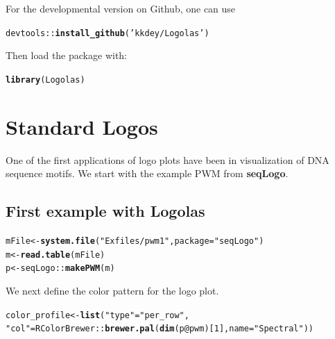 \documentclass[12pt]{article}\usepackage[]{graphicx}\usepackage[usenames,dvipsnames]{color}
\makeatletter
\newcommand{\hlnum}[1]{\textcolor[rgb]{0.686,0.059,0.569}{#1}}%
\newcommand{\hlstr}[1]{\textcolor[rgb]{0.192,0.494,0.8}{#1}}%
\newcommand{\hlopt}[1]{\textcolor[rgb]{0,0,0}{#1}}%
\newcommand{\hlstd}[1]{\textcolor[rgb]{0.345,0.345,0.345}{#1}}%
\newcommand{\hlkwb}[1]{\textcolor[rgb]{0.69,0.353,0.396}{#1}}%
\newcommand{\hlkwc}[1]{\textcolor[rgb]{0.333,0.667,0.333}{#1}}%
\newcommand{\hlkwd}[1]{\textcolor[rgb]{0.737,0.353,0.396}{\textbf{#1}}}%
\newenvironment{kframe}{%
 \def\at@end@of@kframe{}%
 \ifinner\ifhmode%
  \def\at@end@of@kframe{\end{minipage}}%
  \begin{minipage}{\columnwidth}%
 \fi\fi%
 \def\FrameCommand##1{\hskip\@totalleftmargin \hskip-\fboxsep
 \colorbox{shadecolor}{##1}\hskip-\fboxsep
     \hskip-\linewidth \hskip-\@totalleftmargin \hskip\columnwidth}%
 \MakeFramed {\advance\hsize-\width
   \@totalleftmargin\z@ \linewidth\hsize
   \@setminipage}}%
 {\par\unskip\endMakeFramed%
 \at@end@of@kframe}
\newenvironment{knitrout}{}{} %
\makeatother
\begin{document}
For the developmental version on Github, one can use

\begin{knitrout}
\color{fgcolor}\begin{kframe}
\begin{alltt}
\hlstd{devtools}\hlopt{::}\hlkwd{install_github}\hlstd{(}\hlstr{'kkdey/Logolas'}\hlstd{)}
\end{alltt}
\end{kframe}
\end{knitrout}

Then load the package with:

\begin{knitrout}
\color{fgcolor}\begin{kframe}
\begin{alltt}
\hlkwd{library}\hlstd{(Logolas)}
\end{alltt}
\end{kframe}
\end{knitrout}

\section{Standard Logos}

One of the first applications of logo plots have been in visualization of DNA sequence motifs. We start with the example PWM from \textbf{seqLogo}.

\subsection{First example with Logolas}

\begin{knitrout}
\color{fgcolor}\begin{kframe}
\begin{alltt}
\hlstd{mFile} \hlkwb{<-} \hlkwd{system.file}\hlstd{(}\hlstr{"Exfiles/pwm1"}\hlstd{,} \hlkwc{package}\hlstd{=}\hlstr{"seqLogo"}\hlstd{)}
\hlstd{m} \hlkwb{<-} \hlkwd{read.table}\hlstd{(mFile)}
\hlstd{p} \hlkwb{<-} \hlstd{seqLogo}\hlopt{::}\hlkwd{makePWM}\hlstd{(m)}
\end{alltt}
\end{kframe}
\end{knitrout}

We next define the color pattern for the logo plot.

\begin{knitrout}
\color{fgcolor}\begin{kframe}
\begin{alltt}
\hlstd{color_profile} \hlkwb{<-} \hlkwd{list}\hlstd{(}\hlstr{"type"} \hlstd{=} \hlstr{"per_row"}\hlstd{,}
\hlstr{"col"} \hlstd{= RColorBrewer}\hlopt{::}\hlkwd{brewer.pal}\hlstd{(}\hlkwd{dim}\hlstd{(p}\hlopt{@}\hlkwc{pwm}\hlstd{)[}\hlnum{1}\hlstd{],}\hlkwc{name} \hlstd{=}\hlstr{"Spectral"}\hlstd{))}
\end{alltt}
\end{kframe}
\end{knitrout}
\end{document}
